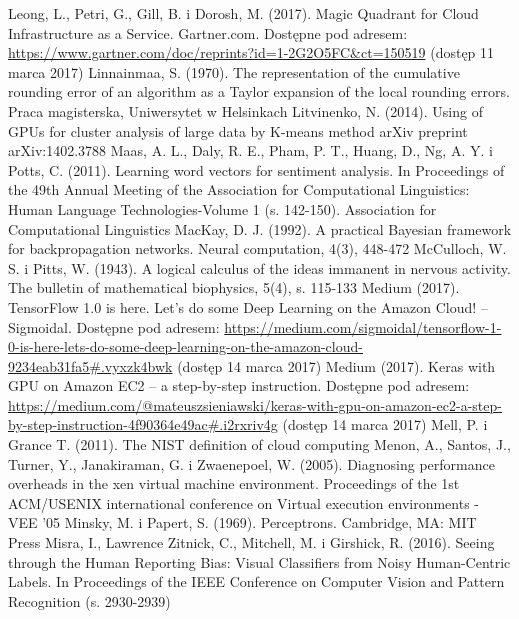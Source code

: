 \documentclass[12pt,a4paper,twoside]{article}
\begin{document}
\begin{thebibliography}{99}
 Leong, L., Petri, G., Gill, B. i Dorosh, M. (2017). Magic Quadrant for Cloud Infrastructure as a Service. Gartner.com. Dostępne pod adresem: \url{https://www.gartner.com/doc/reprints?id=1-2G2O5FC&ct=150519} (dostęp 11 marca 2017)
 Linnainmaa, S. (1970). The representation of the cumulative rounding error of an algorithm as a
Taylor expansion of the local rounding errors. Praca magisterska, Uniwersytet w Helsinkach
 Litvinenko, N. (2014). Using of GPUs for cluster analysis of large data by K-means method arXiv preprint arXiv:1402.3788
 Maas, A. L., Daly, R. E., Pham, P. T., Huang, D., Ng, A. Y. i Potts, C. (2011). Learning word vectors for sentiment analysis. In Proceedings of the 49th Annual Meeting of the Association for Computational Linguistics: Human Language Technologies-Volume 1 (s. 142-150). Association for Computational Linguistics
 MacKay, D. J. (1992). A practical Bayesian framework for backpropagation networks. Neural computation, 4(3), 448-472
 McCulloch, W. S. i Pitts, W. (1943). A logical calculus of the ideas immanent in nervous activity. The bulletin of mathematical biophysics, 5(4), s. 115-133
 Medium (2017). TensorFlow 1.0 is here. Let’s do some Deep Learning on the Amazon Cloud! – Sigmoidal. Dostępne pod adresem: \url{https://medium.com/sigmoidal/tensorflow-1-0-is-here-lets-do-some-deep-learning-on-the-amazon-cloud-9234eab31fa5#.vyxzk4bwk} (dostęp 14 marca 2017)
 Medium (2017). Keras with GPU on Amazon EC2 – a step-by-step instruction. Dostępne pod adresem: \url{https://medium.com/@mateuszsieniawski/keras-with-gpu-on-amazon-ec2-a-step-by-step-instruction-4f90364e49ac#.i2rxriv4g} (dostęp 14 marca 2017)
 Mell, P. i Grance T. (2011). The NIST definition of cloud computing
 Menon, A., Santos, J., Turner, Y., Janakiraman, G. i Zwaenepoel, W. (2005). Diagnosing performance overheads in the xen virtual machine environment. Proceedings of the 1st ACM/USENIX international conference on Virtual execution environments - VEE '05
 Minsky, M. i Papert, S. (1969). Perceptrons. Cambridge, MA: MIT Press
 Misra, I., Lawrence Zitnick, C., Mitchell, M. i Girshick, R. (2016). Seeing through the Human Reporting Bias: Visual Classifiers from Noisy Human-Centric Labels. In Proceedings of the IEEE Conference on Computer Vision and Pattern Recognition (s. 2930-2939)

\end{thebibliography}
\end{document}
